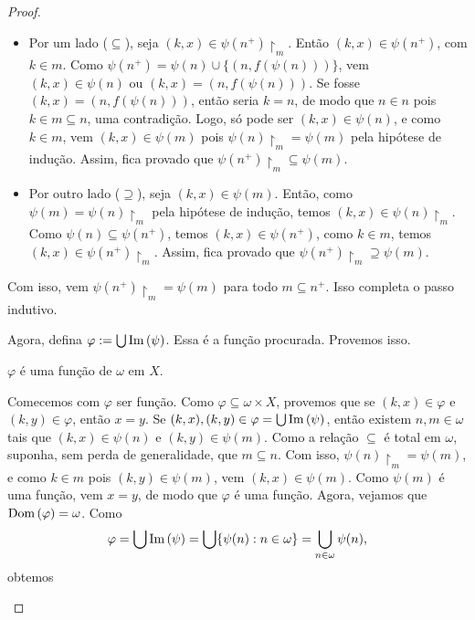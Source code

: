 \begin{proof}
\begin{midproof}
                \begin{itemize}
                    \item Por um lado ($\subseteq$), seja $(k,x) \in \psi(n^+) \restriction_m$. Então $(k,x) \in \psi(n^+)$, com $k \in m$. Como $\psi(n^+) = \psi(n) \cup \{(n, f(\psi(n)))\}$, vem $(k,x) \in \psi(n)$ ou $(k,x) = (n, f(\psi(n)))$. Se fosse $(k,x) = (n, f(\psi(n)))$, então seria $k=n$, de modo que $n \in n$ pois $k \in m \subseteq n$, uma contradição. Logo, só pode ser $(k,x) \in \psi(n)$, e como $k \in m$, vem $(k,x) \in \psi(m)$ pois $\psi(n) \restriction_m = \psi(m)$ pela hipótese de indução. Assim, fica provado que $\psi(n^+) \restriction_m \subseteq \psi(m)$.
                    \item Por outro lado ($\supseteq$), seja $(k,x) \in \psi(m)$. Então, como $\psi(m) = \psi(n) \restriction_m$ pela hipótese de indução, temos $(k,x) \in \psi(n) \restriction_m$. Como $\psi(n) \subseteq \psi(n^+)$, temos $(k,x) \in \psi(n^+)$, como $k \in m$, temos $(k,x) \in \psi(n^+) \restriction_m$. Assim, fica provado que $\psi(n^+) \restriction_m \supseteq \psi(m)$.
                \end{itemize}
            Com isso, vem $\psi(n^+) \restriction_m = \psi(m)$ para todo $m \subseteq n^+$. Isso completa o passo indutivo. \whiteproof
        \end{midproof}
    Agora, defina $\varphi := \bigcup \operatorname{Im}{(\psi)}$. Essa é a função procurada. Provemos isso.
        \begin{claim} \label{set:reccom.claim.varphifuncao}
            $\varphi$ é uma função de $\omega$ em $X$.
        \end{claim}
        \begin{midproof}
            Comecemos com $\varphi$ ser função. Como $\varphi \subseteq \omega \times X$, provemos que se $(k,x) \in \varphi$ e $(k,y) \in \varphi$, então $x=y$. Se $(k,x), (k,y) \in \varphi = \bigcup \operatorname{Im}{(\psi)}$, então existem $n,m \in \omega$ tais que $(k,x) \in \psi(n)$ e $(k,y) \in \psi(m)$. Como a relação $\subseteq$ é total em $\omega$, suponha, sem perda de generalidade, que $m \subseteq n$. Com isso, $\psi(n) \restriction_m = \psi(m)$, e como $k \in m$ pois $(k,y) \in \psi(m)$, vem $(k,x) \in \psi(m)$. Como $\psi(m)$ é uma função, vem $x=y$, de modo que $\varphi$ é uma função. Agora, vejamos que $\operatorname{Dom}{(\varphi)} = \omega$. Como
                \[
                    \varphi = \bigcup \operatorname{Im}{(\psi)} = \bigcup \{\psi(n) : n \in \omega \} = \bigcup_{n \in \omega} \psi(n),
                \]
            obtemos

\end{midproof}
\end{proof}
